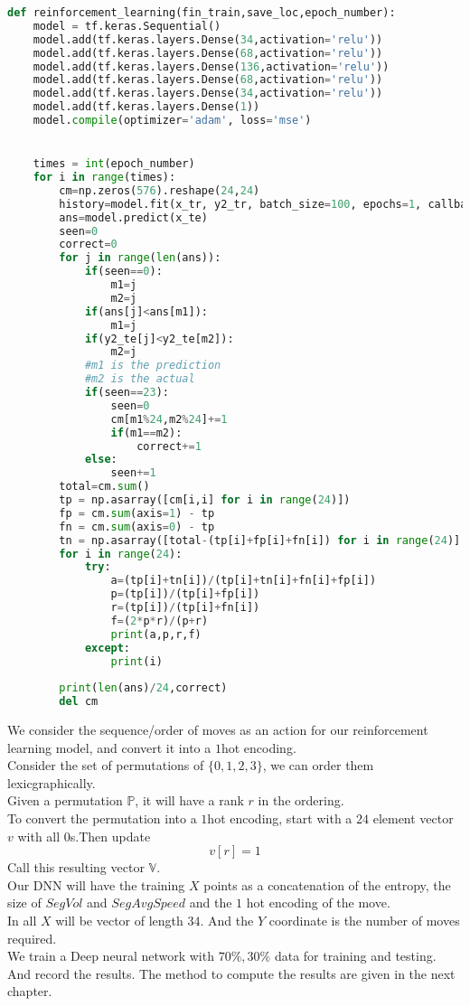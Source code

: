 \begin{lstlisting}[language=Python]
def reinforcement_learning(fin_train,save_loc,epoch_number):
    model = tf.keras.Sequential()
    model.add(tf.keras.layers.Dense(34,activation='relu'))
    model.add(tf.keras.layers.Dense(68,activation='relu'))
    model.add(tf.keras.layers.Dense(136,activation='relu'))
    model.add(tf.keras.layers.Dense(68,activation='relu'))
    model.add(tf.keras.layers.Dense(34,activation='relu'))
    model.add(tf.keras.layers.Dense(1))
    model.compile(optimizer='adam', loss='mse')


    times = int(epoch_number)
    for i in range(times):    
        cm=np.zeros(576).reshape(24,24)
        history=model.fit(x_tr, y2_tr, batch_size=100, epochs=1, callbacks=[cp_callback])
        ans=model.predict(x_te)
        seen=0
        correct=0
        for j in range(len(ans)):
            if(seen==0):
                m1=j
                m2=j
            if(ans[j]<ans[m1]):
                m1=j
            if(y2_te[j]<y2_te[m2]):
                m2=j
            #m1 is the prediction
            #m2 is the actual
            if(seen==23):
                seen=0
                cm[m1%24,m2%24]+=1
                if(m1==m2):
                    correct+=1
            else:
                seen+=1
        total=cm.sum()
        tp = np.asarray([cm[i,i] for i in range(24)])
        fp = cm.sum(axis=1) - tp
        fn = cm.sum(axis=0) - tp
        tn = np.asarray([total-(tp[i]+fp[i]+fn[i]) for i in range(24)]
        for i in range(24):
            try:
                a=(tp[i]+tn[i])/(tp[i]+tn[i]+fn[i]+fp[i])
                p=(tp[i])/(tp[i]+fp[i])
                r=(tp[i])/(tp[i]+fn[i])
                f=(2*p*r)/(p+r)
                print(a,p,r,f)
            except:
                print(i)   
        
        print(len(ans)/24,correct)
        del cm
\end{lstlisting}\par We consider the sequence/order of moves as an action for our reinforcement learning model, and convert it into a $1$hot encoding.\\
Consider the set of permutations of $\{0,1,2,3\}$, we can order them lexicgraphically.\\
Given a permutation $\mathbb{P}$, it will have a rank $r$ in the ordering.\\
To convert the permutation into a $1$hot encoding, start with a $24$ element vector $v$ with all $0$s.Then update 
$$v[r]=1$$
Call this resulting vector $\mathbb{V}$.\\
Our DNN will have the training $X$ points as a concatenation of the entropy, the size of $SegVol$ and $SegAvgSpeed$ and the $1$ hot encoding of the move.\\
In all $X$ will be vector of length $34$. And the $Y$ coordinate is the number of moves required.\\
We train a Deep neural network with $70\%,30\%$ data for training and testing. And record the results. The method to compute the results are given in the next chapter.
